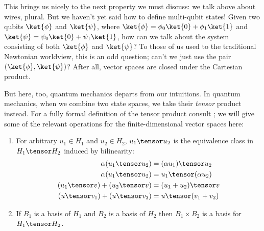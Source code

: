 
This brings us nicely to the next property we must discuss: we talk above about
wire\emph{s}, plural.  But we haven't yet said how to define multi-qubit states!
Given two qubits $\ket{\phi}$ and $\ket{\psi}$, where $\ket{\phi} =
\phi_0\ket{0} + \phi_1\ket{1}$ and $\ket{\psi} = \psi_0\ket{0} + \psi_1\ket{1}$,
how can we talk about the system consisting of both $\ket{\phi}$ and
$\ket{\psi}$?  To those of us used to the traditional Newtonian worldview, this
is an odd question; can't we just use the pair $(\ket{\phi},\ket{\psi})$?  After
all, vector spaces are closed under the Cartesian product.

But here, too, quantum mechanics departs from our intuitions.  In quantum
mechanics, when we combine two state spaces, we take their \emph{tensor} product
instead.  For a fully formal definition of the tensor product
consult \citet{gallier13}; we will give some of the relevant operations for the
finite-dimensional vector spaces here:
\begin{enumerate}
    \item For arbitrary $u_1 \in H_1$ and $u_2 \in H_2$, 
    $u_1 \tensor u_2$ is the equivalence class in $H_1 \tensor H_2$ induced
    by bilinearity:
    \begin{align*}
        \alpha(u_1 \tensor u_2) &= (\alpha u_1) \tensor u_2 \\
        \alpha(u_1 \tensor u_2) &= u_1 \tensor (\alpha u_2) \\
        (u_1 \tensor v) + (u_2 \tensor v) &= (u_1 + u_2) \tensor v \\
        (u \tensor v_1) + (u \tensor v_2) &= u \tensor (v_1 + v_2)
    \end{align*}
    \item If $B_1$ is a basis of $H_1$ and $B_2$ is a basis of $H_2$
    then $B_1 \times B_2$ is a basis for $H_1 \tensor H_2$.
\end{enumerate}


